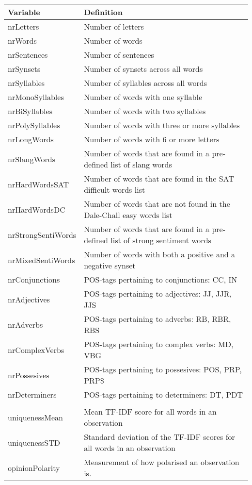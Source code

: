 \begin{tabular}{|l|p{90mm}|} \hline
\textbf{Variable} & \textbf{Definition} \\ \hline
nrLetters & Number of letters \\ \hline
nrWords & Number of words \\ \hline
nrSentences & Number of sentences \\ \hline
nrSynsets & Number of synsets across all words \\ \hline
nrSyllables & Number of syllables across all words \\ \hline
nrMonoSyllables & Number of words with one syllable \\ \hline
nrBiSyllables & Number of words with two syllables \\ \hline
nrPolySyllables & Number of words with three or more syllables \\ \hline
nrLongWords & Number of words with 6 or more letters \\ \hline
nrSlangWords & Number of words that are found in a pre-defined list of slang words \\ \hline
nrHardWordsSAT & Number of words that are found in the SAT difficult words list \\ \hline
nrHardWordsDC & Number of words that are not found in the Dale-Chall easy words list \\ \hline
nrStrongSentiWords & Number of words that are found in a pre-defined list of strong sentiment words \\ \hline
nrMixedSentiWords & Number of words with both a positive and a negative synset \\ \hline
nrConjunctions & POS-tags pertaining to conjunctions: CC, IN \\ \hline
nrAdjectives & POS-tags pertaining to adjectives: JJ, JJR, JJS \\ \hline
nrAdverbs & POS-tags pertaining to adverbs: RB, RBR, RBS \\ \hline
nrComplexVerbs & POS-tags pertaining to complex verbs: MD, VBG \\ \hline
nrPossesives & POS-tags pertaining to possesives: POS, PRP, PRP\$ \\ \hline
nrDeterminers & POS-tags pertaining to determiners: DT, PDT\\ \hline
 \multicolumn{3}{c}{} \\ [-1.5ex] \hline
uniquenessMean & Mean TF-IDF score for all words in an observation \\ \hline
uniquenessSTD & Standard deviation of the TF-IDF scores for all words in an observation \\ \hline
opinionPolarity & Measurement of how polarised an observation is. \\ \hline
\end{tabular}